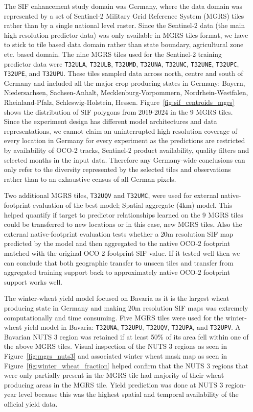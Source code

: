 The SIF enhancement study domain was Germany, where the data domain was represented by a set of Sentinel-2 Military Grid Reference System (MGRS) tiles rather than by a single national level raster. Since the Sentinel-2 data (the main high resolution predictor data) was only available in MGRS tiles format, we have to stick to tile based data domain rather than state boundary, agricultural zone etc. based domain. The nine MGRS tiles used for the Sentinel-2 training predictor data were \texttt{T32ULA}, \texttt{T32ULB}, \texttt{T32UMD}, \texttt{T32UNA}, \texttt{T32UNC}, \texttt{T32UNE}, \texttt{T32UPC}, \texttt{T32UPE}, and \texttt{T32UPU}. These tiles sampled data across north, centre and south of Germany and included all the major crop-producing states in Germany: Bayern, Niedersachsen, Sachsen-Anhalt, Mecklenburg-Vorpommern, Nordrhein-Westfalen, Rheinland-Pfalz, Schleswig-Holstein, Hessen. Figure~\ref{fig:sif_centroids_mgrs} shows the distribution of SIF polygons from 2019-2024 in the 9 MGRS tiles. Since the experiment design has different model architectures and data representations, we cannot claim an uninterrupted high resolution coverage of every location in Germany for every experiment as the predictions are restricted by availability of OCO-2 tracks, Sentinel-2 product availability, quality filters and selected months in the input data. Therefore any Germany-wide conclusions can only refer to the diversity represented by the selected tiles and observations rather than to an exhaustive census of all German pixels.

Two additional MGRS tiles, \texttt{T32UQV} and \texttt{T32UMC}, were used for external native-footprint evaluation of the best model; Spatial-aggregate (4km) model. This helped quantify if target to predictor relationships learned on the 9 MGRS tiles could be transferred to new locations or in this case, new MGRS tiles. Also the external native-footprint evaluation tests whether a 20m resolution SIF map predicted by the model and then aggregated to the native OCO-2 footprint matched with the original OCO-2 footprint SIF value. If it tested well then we can conclude that both geographic transfer to unseen tiles and transfer from aggregated training support back to approximately native OCO-2 footprint support works well.

The winter-wheat yield model focused on Bavaria as it is the largest wheat producing state in Germany and making 20m resolution SIF maps was extremely computationally and time consuming. Five MGRS tiles were used for the winter-wheat yield model in Bavaria: \texttt{T32UNA}, \texttt{T32UPU}, \texttt{T32UQV}, \texttt{T32UPA}, and \texttt{T32UPV}. A Bavarian NUTS 3 region was retained if at least 50\% of its area fell within one of the above MGRS tiles. Visual inspection of the NUTS 3 regions as seen in Figure~\ref{fig:mgrs_nuts3} and associated winter wheat mask map as seen in Figure~\ref{fig:winter_wheat_fraction} helped confirm that the NUTS 3 regions that were only partially present in the MGRS tile had majority of their wheat producing areas in the MGRS tile. Yield prediction was done at NUTS 3 region-year level because this was the highest spatial and temporal availability of the official yield data.   

